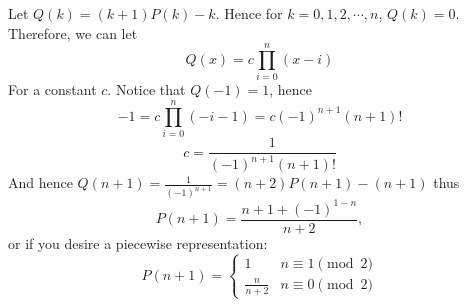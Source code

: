 Let $Q(k)=(k+1)P(k)-k$. Hence for $k=0,1,2,\cdots, n$, $Q(k)=0$. Therefore, we can let
$$Q(x)=c\prod_{i=0}^{n}(x-i)$$
For a constant $c$. Notice that $Q(-1)=1$, hence
$$-1=c\prod_{i=0}^n (-i-1)=c(-1)^{n+1}(n+1)!$$
$$c=\frac{1}{(-1)^{n+1}(n+1)!}$$
And hence $Q(n+1)=\frac{1}{(-1)^{n+1}}=(n+2)P(n+1)-(n+1)$ thus
$$\boxed{P(n+1)=\frac{n+1+(-1)^{1-n}}{n+2}},$$
or if you desire a piecewise representation:
$$\boxed{P(n+1)=\begin{cases}1 & n\equiv 1 \pmod{2} \\ \frac{n}{n+2} & n\equiv 0 \pmod{2}\end{cases}}$$
